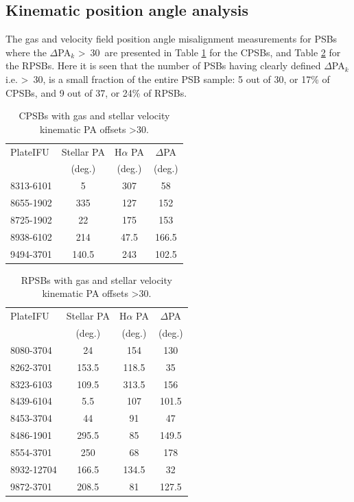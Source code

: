 
\subsection{Kinematic position angle analysis}
\label{PA-misalignment}
The gas and velocity field position angle misalignment measurements for PSBs where the $\Delta$PA$_{k}$ \textgreater\ 30\textdegree\ are presented in Table \ref{tab:offsetCPSBs} for the CPSBs, and Table \ref{tab:offsetRPSBs} for the RPSBs. Here it is seen that the number of PSBs having clearly defined $\Delta$PA$_{k}$ i.e. \textgreater\ 30\textdegree, is a small fraction of the entire PSB sample: 5 out of 30, or 17\% of CPSBs, and 9 out of 37, or 24\% of RPSBs. 

\begin{table}
\centering
\caption{CPSBs with gas and stellar velocity kinematic PA offsets \textgreater 30\textdegree.}
\label{tab:offsetCPSBs}
\begin{tabular}{lccc}
\hline
PlateIFU  & Stellar PA & H$\alpha$ PA & $\Delta$PA \\
  & (deg.) & (deg.) & (deg.) \\
\hline
8313-6101 & 5 & 307 & 58 \\
8655-1902 & 335 & 127 & 152 \\
8725-1902 & 22 & 175 & 153 \\
8938-6102 & 214 & 47.5 & 166.5 \\
9494-3701 & 140.5 & 243 & 102.5 \\
\hline
\end{tabular}
\end{table}

\begin{table}
\centering
\caption[RPSBs with kinematic velocity PA offsets \textgreater 30\textdegree.]{RPSBs with gas and stellar velocity kinematic PA offsets \textgreater 30\textdegree.}
\label{tab:offsetRPSBs}
\begin{tabular}{lccc}
\hline
PlateIFU   & Stellar PA & H$\alpha$ PA & $\Delta$PA \\
  & (deg.) & (deg.) & (deg.) \\
\hline
8080-3704 & 24 & 154 & 130 \\
8262-3701 & 153.5 & 118.5 & 35 \\
8323-6103 & 109.5 & 313.5 & 156 \\
8439-6104 & 5.5 & 107 & 101.5 \\
8453-3704 & 44 & 91 & 47 \\
8486-1901 & 295.5 & 85 & 149.5 \\
8554-3701 & 250 & 68 & 178 \\
8932-12704 & 166.5 & 134.5 & 32 \\
9872-3701 & 208.5 & 81 & 127.5 \\
\hline
\end{tabular}
\end{table}

